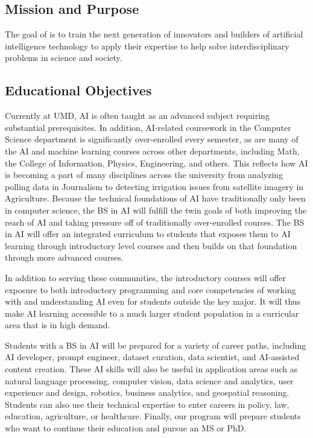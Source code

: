 
\subsection{Mission and Purpose}

The goal of \name{} is to train the next generation of innovators and builders of artificial intelligence technology to apply their expertise to help solve interdisciplinary problems in science and society.

\subsection{Educational Objectives}

Currently at UMD, AI is often taught as an advanced subject requiring substantial prerequisites. In addition, AI-related coursework in the Computer Science department is significantly over-enrolled every semester, as are many of the AI and machine learning courses across other departments, including Math, the College of Information, Physics, Engineering, and others. This reflects how AI is becoming a part of many disciplines across the university from analyzing polling data in Journalism to detecting irrigation issues from satellite imagery in Agriculture.  Because the technical foundations of AI have traditionally only been in computer science, the BS in AI will fulfill the twin goals of both improving the reach of AI and taking pressure off of traditionally over-enrolled courses.  The BS in AI will offer an integrated curriculum to students that exposes them to AI learning through introductory level courses and then builds on that foundation through more advanced courses. 

In addition to serving these communities, the introductory courses will offer exposure to both introductory programming and core competencies of working with and understanding AI even for students outside the key major.  It will thus make AI learning accessible to a much larger student population in a curricular area that is in high demand.

Students with a BS in AI will be prepared for a variety of career paths, including AI developer, prompt engineer, dataset curation, data scientist, and AI-assisted content creation.  These AI skills will also be useful in application areas such as natural language processing, computer vision, data science and analytics, user experience and design, robotics, business analytics, and geospatial reasoning. Students can also use their technical expertise to enter careers in policy, law, education, agriculture, or healthcare. Finally, our program will prepare students who want to continue their education and pursue an MS or PhD.


